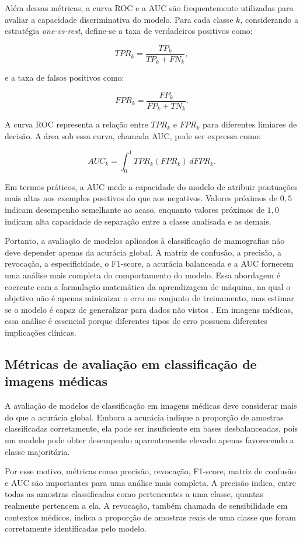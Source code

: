 \documentclass[
    12pt,
    openright,
    oneside,
    a4paper,
    english,
    brazil
]{abntex2}
\begin{document}
Além dessas métricas, a curva ROC e a AUC são frequentemente utilizadas para avaliar a capacidade discriminativa do modelo. Para cada classe \(k\), considerando a estratégia \textit{one-vs-rest}, define-se a taxa de verdadeiros positivos como:

\[
TPR_k =
\frac{TP_k}{TP_k + FN_k},
\]

e a taxa de falsos positivos como:

\[
FPR_k =
\frac{FP_k}{FP_k + TN_k}.
\]

A curva ROC representa a relação entre \(TPR_k\) e \(FPR_k\) para diferentes limiares de decisão. A área sob essa curva, chamada AUC, pode ser expressa como:

\[
AUC_k =
\int_{0}^{1}
TPR_k(FPR_k)\,dFPR_k.
\]

Em termos práticos, a AUC mede a capacidade do modelo de atribuir pontuações mais altas aos exemplos positivos do que aos negativos. Valores próximos de \(0{,}5\) indicam desempenho semelhante ao acaso, enquanto valores próximos de \(1{,}0\) indicam alta capacidade de separação entre a classe analisada e as demais.

Portanto, a avaliação de modelos aplicados à classificação de mamografias não deve depender apenas da acurácia global. A matriz de confusão, a precisão, a revocação, a especificidade, o F1-score, a acurácia balanceada e a AUC fornecem uma análise mais completa do comportamento do modelo. Essa abordagem é coerente com a formulação matemática da aprendizagem de máquina, na qual o objetivo não é apenas minimizar o erro no conjunto de treinamento, mas estimar se o modelo é capaz de generalizar para dados não vistos \cite{deisenroth2020mathematics}. Em imagens médicas, essa análise é essencial porque diferentes tipos de erro possuem diferentes implicações clínicas.


\subsection{Métricas de avaliação em classificação de imagens médicas}

A avaliação de modelos de classificação em imagens médicas deve considerar mais do que a acurácia global. Embora a acurácia indique a proporção de amostras classificadas corretamente, ela pode ser insuficiente em bases desbalanceadas, pois um modelo pode obter desempenho aparentemente elevado apenas favorecendo a classe majoritária.

Por esse motivo, métricas como precisão, revocação, F1-score, matriz de confusão e AUC são importantes para uma análise mais completa. A precisão indica, entre todas as amostras classificadas como pertencentes a uma classe, quantas realmente pertencem a ela. A revocação, também chamada de sensibilidade em contextos médicos, indica a proporção de amostras reais de uma classe que foram corretamente identificadas pelo modelo.
\end{document}

